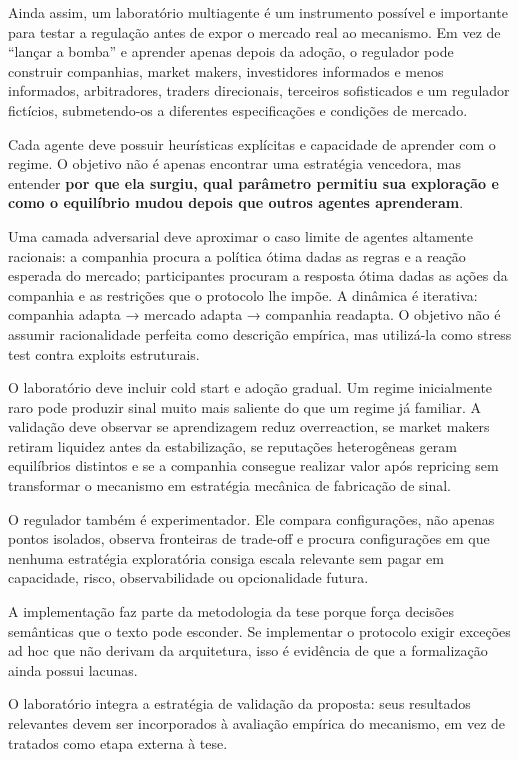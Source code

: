 \documentclass[
  a4paper,
]{article}
\begin{document}
Ainda assim, um laboratório multiagente é um instrumento possível e
importante para testar a regulação antes de expor o mercado real ao
mecanismo. Em vez de ``lançar a bomba'' e aprender apenas depois da
adoção, o regulador pode construir companhias, market makers,
investidores informados e menos informados, arbitradores, traders
direcionais, terceiros sofisticados e um regulador fictícios,
submetendo-os a diferentes especificações e condições de mercado.

Cada agente deve possuir heurísticas explícitas e capacidade de aprender
com o regime. O objetivo não é apenas encontrar uma estratégia
vencedora, mas entender \textbf{por que ela surgiu, qual parâmetro
permitiu sua exploração e como o equilíbrio mudou depois que outros
agentes aprenderam}.

Uma camada adversarial deve aproximar o caso limite de agentes altamente
racionais: a companhia procura a política ótima dadas as regras e a
reação esperada do mercado; participantes procuram a resposta ótima
dadas as ações da companhia e as restrições que o protocolo lhe impõe. A
dinâmica é iterativa: companhia adapta → mercado adapta → companhia
readapta. O objetivo não é assumir racionalidade perfeita como descrição
empírica, mas utilizá-la como stress test contra exploits estruturais.

O laboratório deve incluir cold start e adoção gradual. Um regime
inicialmente raro pode produzir sinal muito mais saliente do que um
regime já familiar. A validação deve observar se aprendizagem reduz
overreaction, se market makers retiram liquidez antes da estabilização,
se reputações heterogêneas geram equilíbrios distintos e se a companhia
consegue realizar valor após repricing sem transformar o mecanismo em
estratégia mecânica de fabricação de sinal.

O regulador também é experimentador. Ele compara configurações, não
apenas pontos isolados, observa fronteiras de trade-off e procura
configurações em que nenhuma estratégia exploratória consiga escala
relevante sem pagar em capacidade, risco, observabilidade ou
opcionalidade futura.

A implementação faz parte da metodologia da tese porque força decisões
semânticas que o texto pode esconder. Se implementar o protocolo exigir
exceções ad hoc que não derivam da arquitetura, isso é evidência de que
a formalização ainda possui lacunas.

O laboratório integra a estratégia de validação da proposta: seus
resultados relevantes devem ser incorporados à avaliação empírica do
mecanismo, em vez de tratados como etapa externa à tese.
\end{document}
